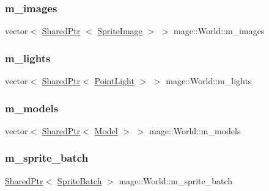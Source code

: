 \subsubsection{\texorpdfstring{m\+\_\+images}{m\_images}}
{\footnotesize\ttfamily vector$<$ \hyperlink{namespacemage_a1e01ae66713838a7a67d30e44c67703e}{Shared\+Ptr} $<$ \hyperlink{classmage_1_1_sprite_image}{Sprite\+Image} $>$ $>$ mage\+::\+World\+::m\+\_\+images\hspace{0.3cm}{\ttfamily [private]}}

\hypertarget{classmage_1_1_world_a781af9ce8b1e03c5c606e3523323005b}{}\label{classmage_1_1_world_a781af9ce8b1e03c5c606e3523323005b} 
\subsubsection{\texorpdfstring{m\+\_\+lights}{m\_lights}}
{\footnotesize\ttfamily vector$<$ \hyperlink{namespacemage_a1e01ae66713838a7a67d30e44c67703e}{Shared\+Ptr}$<$ \hyperlink{classmage_1_1_point_light}{Point\+Light} $>$ $>$ mage\+::\+World\+::m\+\_\+lights\hspace{0.3cm}{\ttfamily [private]}}

\hypertarget{classmage_1_1_world_ad69d681d960e32f62800bfcfa88d7737}{}\label{classmage_1_1_world_ad69d681d960e32f62800bfcfa88d7737} 
\subsubsection{\texorpdfstring{m\+\_\+models}{m\_models}}
{\footnotesize\ttfamily vector$<$ \hyperlink{namespacemage_a1e01ae66713838a7a67d30e44c67703e}{Shared\+Ptr}$<$ \hyperlink{classmage_1_1_model}{Model} $>$ $>$ mage\+::\+World\+::m\+\_\+models\hspace{0.3cm}{\ttfamily [private]}}

\hypertarget{classmage_1_1_world_abb5d26cbfbd7b5792a53359b823c9f37}{}\label{classmage_1_1_world_abb5d26cbfbd7b5792a53359b823c9f37} 
\subsubsection{\texorpdfstring{m\+\_\+sprite\+\_\+batch}{m\_sprite\_batch}}
{\footnotesize\ttfamily \hyperlink{namespacemage_a1e01ae66713838a7a67d30e44c67703e}{Shared\+Ptr}$<$ \hyperlink{classmage_1_1_sprite_batch}{Sprite\+Batch} $>$ mage\+::\+World\+::m\+\_\+sprite\+\_\+batch\hspace{0.3cm}{\ttfamily [private]}}

